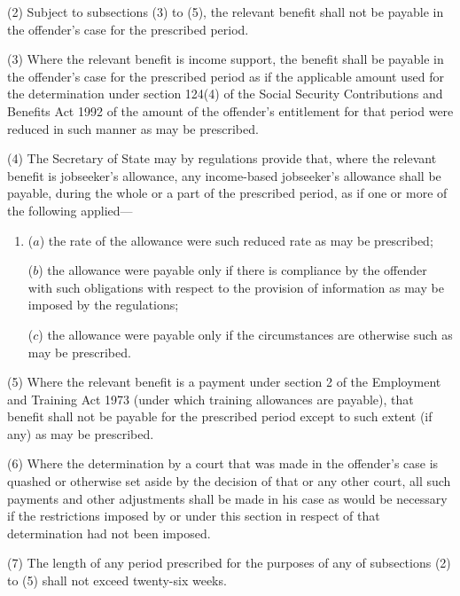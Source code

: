\documentclass[12pt,a4paper]{article}
\begin{document}
(2) Subject to subsections (3)  to (5), the relevant benefit shall not be payable in the offender’s case for the prescribed period.

(3) Where the relevant benefit is income support, the benefit shall be payable in the offender’s case for the prescribed period as if the applicable amount used for the determination under section 124(4)  of the Social Security Contributions and Benefits Act 1992 of the amount of the offender’s entitlement for that period were reduced in such manner as may be prescribed.

(4) The Secretary of State may by regulations provide that, where the relevant benefit is jobseeker’s allowance, any income-based jobseeker’s allowance shall be payable, during the whole or a part of the prescribed period, as if one or more of the following applied—
\begin{enumerate}\item[]
($a$) the rate of the allowance were such reduced rate as may be prescribed;

($b$) the allowance were payable only if there is compliance by the offender with such obligations with respect to the provision of information as may be imposed by the regulations;

($c$) the allowance were payable only if the circumstances are otherwise such as may be prescribed.
\end{enumerate}

(5) Where the relevant benefit is a payment under section 2 of the Employment and Training Act 1973 (under which training allowances are payable), that benefit shall not be payable for the prescribed period except to such extent (if any) as may be prescribed.

(6) Where the determination by a court that was made in the offender’s case is quashed or otherwise set aside by the decision of that or any other court, all such payments and other adjustments shall be made in his case as would be necessary if the restrictions imposed by or under this section in respect of that determination had not been imposed.

(7) The length of any period prescribed for the purposes of any of subsections (2)  to (5)  shall not exceed twenty-six weeks.
\end{document}
